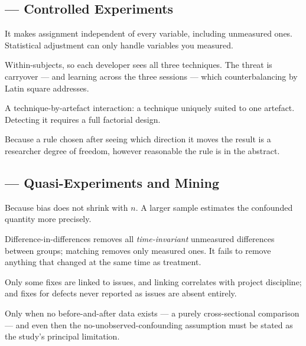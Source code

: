 \subsection*{ --- Controlled Experiments}
\begin{tightnum}
  \item It makes assignment independent of every variable, including unmeasured
    ones. Statistical adjustment can only handle variables you measured.
  \item Within-subjects, so each developer sees all three techniques. The threat
    is carryover --- and learning across the three sessions --- which
    counterbalancing by Latin square addresses.
  \item A technique-by-artefact interaction: a technique uniquely suited to one
    artefact. Detecting it requires a full factorial design.
  \item Because a rule chosen after seeing which direction it moves the result
    is a researcher degree of freedom, however reasonable the rule is in the
    abstract.
\end{tightnum}

\subsection*{ --- Quasi-Experiments and Mining}
\begin{tightnum}
  \item Because bias does not shrink with $n$. A larger sample estimates the
    confounded quantity more precisely.
  \item Difference-in-differences removes all \emph{time-invariant} unmeasured
    differences between groups; matching removes only measured ones. It fails
    to remove anything that changed at the same time as treatment.
  \item Only some fixes are linked to issues, and linking correlates with
    project discipline; and fixes for defects never reported as issues are
    absent entirely.
  \item Only when no before-and-after data exists --- a purely cross-sectional
    comparison --- and even then the no-unobserved-confounding assumption must
    be stated as the study's principal limitation.
\end{tightnum}

